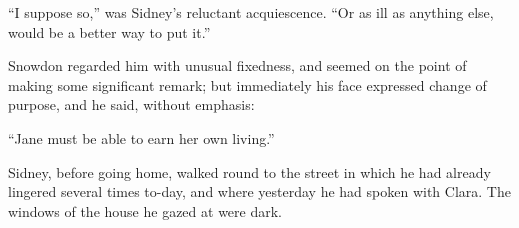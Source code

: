 {\protect\hypertarget{251}{}{}}``I suppose so,'' was Sidney's reluctant
acquiescence. ``Or as ill as anything else, would be a better way to put
it.''

Snowdon regarded him with unusual fixedness, and seemed on the point of
making some significant remark; but immediately his face expressed
change of purpose, and he said, without emphasis:

``Jane must be able to earn her own living.''

Sidney, before going home, walked round to the street in which he had
already lingered several times to-day, and where yesterday he had spoken
with Clara. The windows of the house he gazed at were dark.
